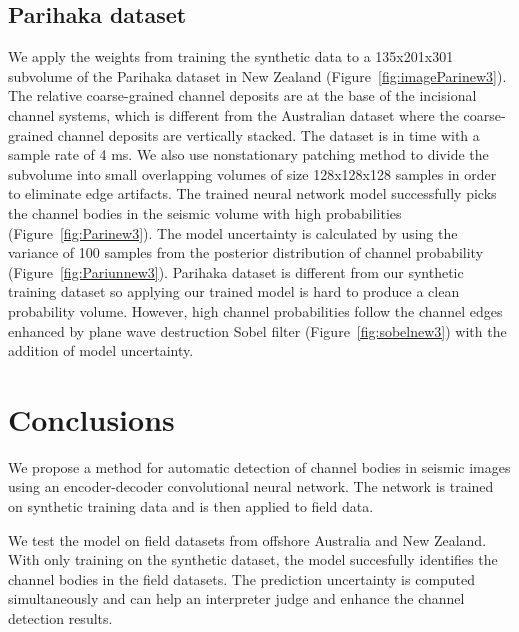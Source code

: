 \subsection{Parihaka dataset}
We apply the weights from training the synthetic data to a 135x201x301 subvolume of the Parihaka dataset in New Zealand (Figure~\ref{fig:imageParinew3}). The relative coarse-grained channel deposits are at the base of the incisional channel systems, which is different from the Australian dataset where the coarse-grained channel deposits are vertically stacked. The dataset is in time with a sample rate of 4 ms. We also use nonstationary patching method \cite[]{geoest} to divide the subvolume into small overlapping volumes of size 128x128x128 samples in order to eliminate edge artifacts. The trained neural network model successfully picks the channel bodies in the seismic volume with high probabilities (Figure~\ref{fig:Parinew3}). The model uncertainty is calculated by using the variance of 100 samples from the posterior distribution of channel probability (Figure~\ref{fig:Pariunnew3}). Parihaka dataset is different from our synthetic training dataset so applying our trained model is hard to produce a clean probability volume. However, high channel probabilities follow the channel edges enhanced by plane wave destruction Sobel filter \cite[]{Mason} (Figure~\ref{fig:sobelnew3}) with the addition of model uncertainty.  

\section{Conclusions}
We propose a method for automatic detection of channel bodies in seismic images using an encoder-decoder convolutional neural network. The network is trained on synthetic training data and is then applied to field data.

We test the model on field datasets from offshore Australia and New Zealand. With only training on the synthetic dataset, the model succesfully identifies the channel bodies in the field datasets. The prediction uncertainty is computed simultaneously and can help an interpreter judge and enhance the channel detection results. 

